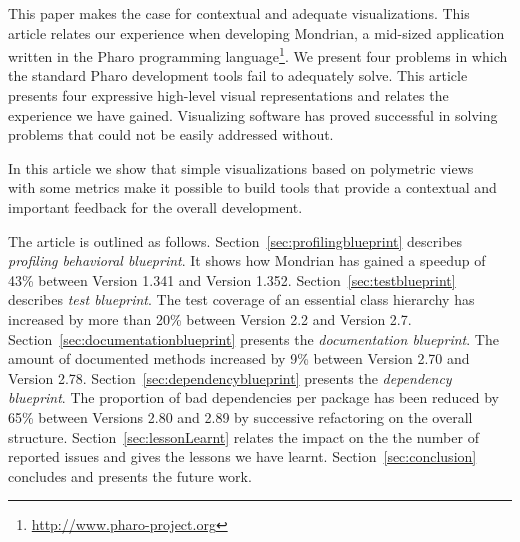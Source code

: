 \documentclass[runningheads]{llncs}
\newcommand{\sd}[1]{\nb{SD}{orange}{#1}}
\newcommand{\secref}[1]{Section~\ref{sec:#1}}
\begin{document}








This paper makes the case for contextual and adequate visualizations. This article relates our experience when developing Mondrian, a mid-sized application written in the Pharo programming language\footnote{\url{http://www.pharo-project.org}}. We present four problems in which the standard Pharo development tools fail to adequately solve. This article presents four expressive high-level visual representations and relates the experience we have gained. Visualizing software has proved successful in solving problems that could not be easily addressed without.

In this article we show that simple visualizations based on polymetric views~\cite{Lanz03d} with some metrics make it possible to build tools that provide a contextual and important feedback for the overall development.

The article is outlined as follows.
\secref{profilingblueprint} describes \emph{profiling behavioral blueprint}. It shows how Mondrian has gained a speedup of 43\% between Version 1.341 and Version 1.352.
\secref{testblueprint} describes \emph{test blueprint}. The test coverage of an essential class hierarchy has increased by more than 20\% between Version 2.2 and Version 2.7.
\secref{documentationblueprint} presents the \emph{documentation blueprint}. The amount of documented methods increased by 9\% between Version 2.70 and Version 2.78. 
\secref{dependencyblueprint} presents the \emph{dependency blueprint}. The proportion of bad dependencies per package has been reduced by 65\% between Versions 2.80 and 2.89 by successive refactoring on the overall structure.
\secref{lessonLearnt} relates the impact on the the number of reported issues and gives the lessons we have learnt.
\secref{conclusion} concludes and presents the future work.


\end{document}
